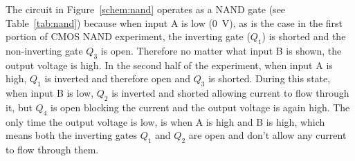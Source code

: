 The circuit in Figure~\ref{schem:nand} operates as a NAND gate (see Table~\ref{tab:nand}) because when input A is low (\SI{0}{V}), as is the case in the first portion of CMOS NAND experiment, the inverting gate ($Q_1$) is shorted and the non-inverting gate $Q_3$ is open.  Therefore no matter what input B is shown, the output voltage is high.  In the second half of the experiment, when input A is high, $Q_1$ is inverted and therefore open and $Q_3$ is shorted. During this state, when input B is low, $Q_2$ is inverted and shorted allowing current to flow through it, but $Q_4$ is open blocking the current and the output voltage is again high.  The only time the output voltage is low, is when A is high and B is high, which means both the inverting gates $Q_1$ and $Q_2$ are open and don't allow any current to flow through them.





